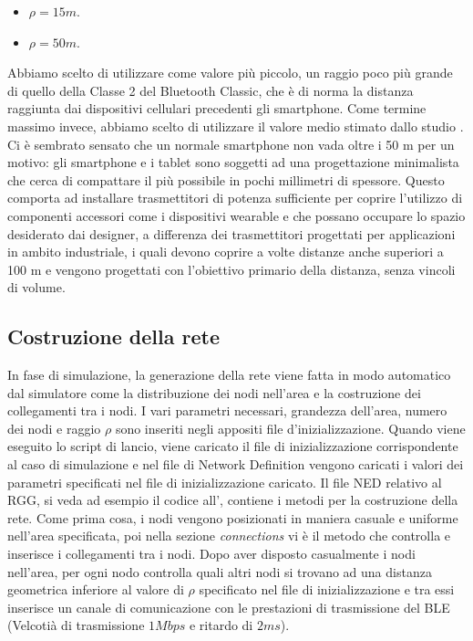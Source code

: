 \begin{itemize}
	\item $\rho = 15 m$.
	\item $\rho = 50 m$.
\end{itemize}
Abbiamo scelto di utilizzare come valore più piccolo, un raggio poco più grande di quello della Classe 2 del Bluetooth Classic, che è di norma la distanza raggiunta dai dispositivi cellulari precedenti gli smartphone. Come termine massimo invece, abbiamo scelto di utilizzare il valore medio stimato dallo studio \cite{tesi_tibertoa2013}. Ci è sembrato sensato che un normale smartphone non vada oltre i 50 m per un motivo: gli smartphone e i tablet sono soggetti ad una progettazione minimalista che cerca di compattare il più possibile in pochi millimetri di spessore. Questo comporta ad installare trasmettitori di potenza sufficiente per coprire l'utilizzo di componenti accessori come i dispositivi wearable e che possano occupare lo spazio desiderato dai designer, a differenza dei trasmettitori progettati per applicazioni in ambito industriale, i quali devono coprire a volte distanze anche superiori a 100 m e vengono progettati con l'obiettivo primario della distanza, senza vincoli di volume.

\subsection{Costruzione della rete}
In fase di simulazione, la generazione della rete viene fatta in modo automatico dal simulatore come la distribuzione dei nodi nell'area e la costruzione dei collegamenti tra i nodi. I vari parametri necessari, grandezza dell'area, numero dei nodi e raggio $\rho$ sono inseriti negli appositi file d'inizializzazione. Quando viene eseguito lo script di lancio, viene caricato il file di inizializzazione corrispondente al caso di simulazione e nel file di Network Definition vengono caricati i valori dei parametri specificati nel file di inizializzazione caricato. Il file \acs{NED} relativo al \acs{RGG}, si veda ad esempio il codice all', contiene i metodi per la costruzione della rete. Come prima cosa, i nodi vengono posizionati in maniera casuale e uniforme nell'area specificata, poi nella sezione \textit{connections} vi è il metodo che controlla e inserisce i collegamenti tra i nodi. Dopo aver disposto casualmente i nodi nell'area, per ogni nodo controlla quali altri nodi si trovano ad una distanza geometrica inferiore al valore di $\rho$ specificato nel file di inizializzazione e tra essi inserisce un canale di comunicazione con le prestazioni di trasmissione del \acs{BLE} (Velcotià di trasmissione $ 1Mbps $ e ritardo di $ 2ms $).


